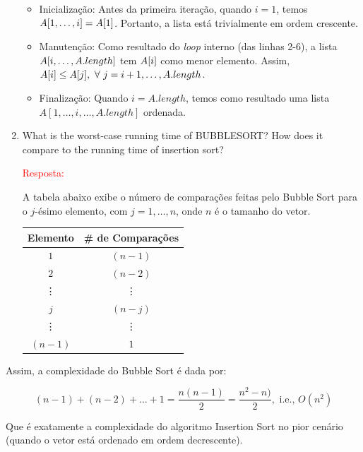 \documentclass{article}
\begin{document}
\begin{enumerate}[label=\Alph*]
  \begin{itemize}
      \item Inicialização: Antes da primeira iteração, quando $i=1$, temos $\normalfont{A}[1,\dots,i] = \normalfont{A}[1]$. Portanto, a lista está trivialmente em ordem crescente.
      
      \item Manutenção: Como resultado do \textit{loop} interno (das linhas 2-6), a lista $\normalfont{A}[i,\dots,\normalfont{A}.length]$ tem $\normalfont{A}[i]$ como menor elemento. Assim, $\normalfont{A}[i]\leq A[j],~\forall~j=i+1,\dots,A.length$.
      
      \item Finalização: Quando $i=A.length$, temos como resultado uma lista $A[1,\dots,i,\dots,A.length]$ ordenada.
      
  \end{itemize}
 
  
  \item What is the worst-case running time of BUBBLESORT? How does it compare to the running time of insertion sort?
  
  \textcolor{red}{Resposta:}
  
  A tabela abaixo exibe o número de comparações feitas pelo Bubble Sort para o $j$-ésimo elemento, com $j=1,\dots,n$, onde $n$ é o tamanho do vetor.
  
  \begin{center}
      \begin{tabular}{c|c}
           \textbf{Elemento}&\textbf{\# de Comparações}  \\
           \hline
           $1$ & $(n-1)$ \\
           $2$ & $(n-2)$ \\
           \vdots & \vdots \\
           $j$ & $(n-j)$ \\
           \vdots & \vdots \\
           $(n-1)$ & $1$ \\ 
      \end{tabular}
  \end{center}
\end{enumerate}

Assim, a complexidade do Bubble Sort é dada por:

$$
(n-1)+(n-2)+\dots+1 = \frac{n(n-1)}{2} = \frac{n^2-n)}{2}, \text{ i.e., } O(n^2)
$$

Que é exatamente a complexidade do algoritmo Insertion Sort no pior cenário (quando o vetor está ordenado em ordem decrescente). 
\end{document}
